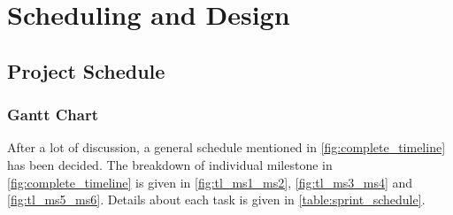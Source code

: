 \section{Scheduling and Design}


\subsection{Project Schedule}
\subsubsection{Gantt Chart}
After a lot of discussion, a general schedule mentioned in \autoref{fig:complete_timeline} has been decided. The breakdown of individual milestone in \autoref{fig:complete_timeline} is given in \autoref{fig:tl_ms1_ms2}, \autoref{fig:tl_ms3_ms4} and \autoref{fig:tl_ms5_ms6}. Details about each task is given in \autoref{table:sprint_schedule}.


